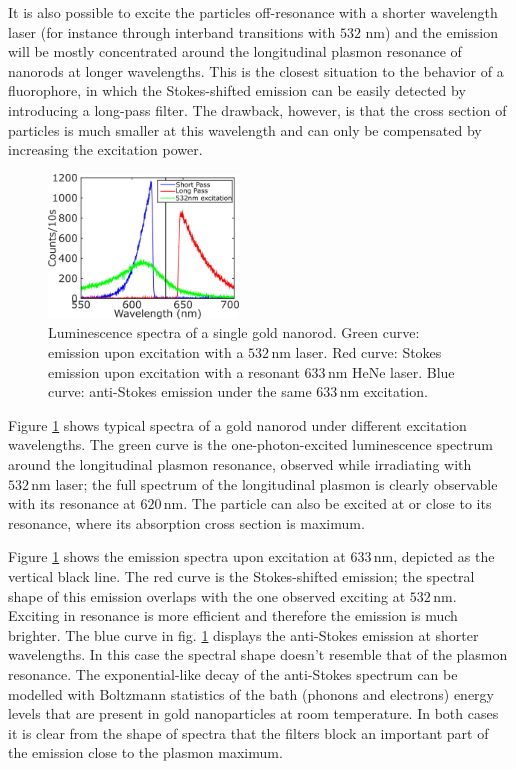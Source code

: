 \documentclass[journal=nalefd,manuscript=letter]{achemso}
\newcommand{\nm}{\ensuremath{\,\textrm{nm}}}
\begin{document}
It is also possible to excite the particles off-resonance with a shorter
wavelength laser (for instance through interband transitions with $532\,\nm$)
and the emission will be mostly concentrated around the longitudinal plasmon
resonance of nanorods at longer wavelengths. This is the closest situation to
the behavior of a fluorophore, in which the Stokes-shifted emission can be
easily detected by introducing a long-pass filter. The drawback, however, is
that the cross section of particles is much smaller at this wavelength and can
only be compensated by increasing the excitation power.

\begin{figure}[htp] \centering
\includegraphics[width=0.45\textwidth]{Figures/01_3_Curves/3_curves_final.png}
\caption{Luminescence spectra of a single gold nanorod. Green curve: emission
upon excitation with a $532\nm$ laser. Red curve: Stokes emission upon
excitation with a resonant $633\nm$ HeNe laser. Blue curve: anti-Stokes emission
under the same $633\nm$ excitation.}
	\label{fig:spectra_rod}
\end{figure}

Figure \ref{fig:spectra_rod} shows typical spectra of a gold nanorod under
different excitation wavelengths. The green curve is the one-photon-excited
luminescence spectrum around the longitudinal plasmon resonance, observed while
irradiating with $532\nm$ laser; the full spectrum of the longitudinal plasmon
is clearly observable with its resonance at $620\nm$. The particle can also be
excited at or close to its resonance, where its absorption cross section is
maximum. 

Figure \ref{fig:spectra_rod} shows the emission spectra upon excitation at
$633\nm$, depicted as the vertical black line. The red curve is the
Stokes-shifted emission; the spectral shape of this emission overlaps with the
one observed exciting at $532\nm$. Exciting in resonance is more efficient and
therefore the emission is much brighter. The blue curve in fig.
\ref{fig:spectra_rod} displays the anti-Stokes emission at shorter wavelengths.
In this case the spectral shape doesn't resemble that of the plasmon resonance.
The exponential-like decay of the anti-Stokes spectrum can be modelled with
Boltzmann statistics\cite{He2015} of the bath (phonons and electrons) energy
levels that are present in gold nanoparticles at room temperature. In both cases
it is clear from the shape of spectra that the filters block an important part of the
emission close to the plasmon maximum.
 
\end{document}
